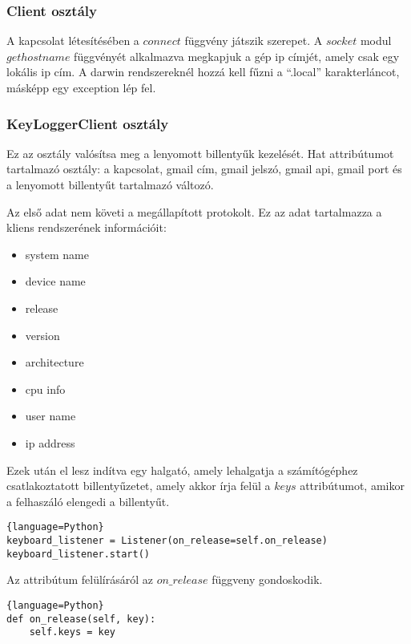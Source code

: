 \documentclass[a4paper, 11pt]{article}
\begin{document}
\subsubsection{Client osztály}\label{subsubsec:clinetclass}

A kapcsolat létesítésében a $connect$ függvény játszik szerepet. A $socket$ modul $gethostname$ függvényét alkalmazva megkapjuk a gép ip címjét, amely csak egy lokális ip cím. A darwin rendszereknél hozzá kell fűzni a ``.local'' karakterláncot, másképp egy exception lép fel.


\subsubsection{KeyLoggerClient osztály}\label{subsubsec:keyloggerclientclass}
Ez az osztály valósítsa meg a lenyomott billentyűk kezelését. Hat attribútumot tartalmazó osztály: a kapcsolat, gmail cím, gmail jelszó, gmail api, gmail port és a lenyomott billentyűt tartalmazó változó.

Az első adat nem követi a megállapított protokolt. Ez az adat tartalmazza a kliens rendszerének információit:
\begin{itemize}
\item system name
\item device name
\item release
\item version
\item architecture
\item cpu info
\item user name
\item ip address
\end{itemize}
Ezek után el lesz indítva egy halgató, amely lehalgatja a számítógéphez csatlakoztatott billentyűzetet, amely akkor írja felül a $keys$ attribútumot, amikor a felhaszáló elengedi a billentyűt.
\begin{lstlisting}{language=Python}
keyboard_listener = Listener(on_release=self.on_release)
keyboard_listener.start()
\end{lstlisting}
Az attribútum felülírásáról az $on\_release$ függveny gondoskodik.
\begin{lstlisting}{language=Python}
def on_release(self, key):
	self.keys = key
\end{lstlisting}
\end{document}
